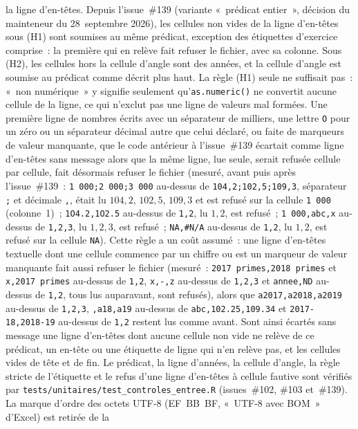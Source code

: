 \documentclass[a4paper,11pt]{article}
\newcommand{\code}[1]{\texttt{\small #1}}
\begin{document}
la ligne d'en-têtes. Depuis l'issue~\#139 (variante «~prédicat entier~», décision du mainteneur
du 28~septembre 2026), les cellules non vides de la ligne d'en-têtes sous (H1) sont soumises au
même prédicat, exception des étiquettes d'exercice comprise~: la première qui en relève fait
refuser le fichier, avec sa colonne. Sous (H2), les cellules hors la cellule d'angle sont des
années, et la cellule d'angle est soumise au prédicat comme décrit plus haut. La règle (H1)
seule ne suffisait pas~: «~non numérique~» y signifie seulement qu'\code{as.numeric()} ne
convertit aucune cellule de la ligne, ce qui n'exclut pas une ligne de valeurs mal formées. Une
première ligne de nombres écrits avec un séparateur de milliers, une lettre \code{O} pour un
zéro ou un séparateur décimal autre que celui déclaré, ou faite de marqueurs de valeur
manquante, que le code antérieur à l'issue~\#139 écartait comme ligne d'en-têtes sans message
alors que la même ligne, lue seule, serait refusée cellule par cellule, fait désormais refuser
le fichier (mesuré, avant puis après l'issue~\#139~: \code{1 000;2 000;3 000} au-dessus de
\code{104,2;102,5;109,3}, séparateur \code{;} et décimale \code{,}, était lu $104{,}2$,
$102{,}5$, $109{,}3$ et est refusé sur la cellule \code{1 000} (colonne~1)~; \code{1O4.2,1O2.5}
au-dessus de \code{1,2}, lu $1, 2$, est refusé~; \code{1 000,abc,x} au-dessus de \code{1,2,3},
lu $1, 2, 3$, est refusé~; \code{NA,\#N/A} au-dessus de \code{1,2}, lu $1, 2$, est refusé sur
la cellule \code{NA}). Cette règle a un coût assumé~: une ligne d'en-têtes textuelle dont une
cellule commence par un chiffre ou est un marqueur de valeur manquante fait aussi refuser le
fichier (mesuré~: \code{2017 primes,2018 primes} et \code{x,2017 primes} au-dessus de
\code{1,2}, \code{x,-,z} au-dessus de \code{1,2,3} et \code{annee,ND} au-dessus de \code{1,2},
tous lus auparavant, sont refusés), alors que \code{a2017,a2018,a2019} au-dessus de
\code{1,2,3}, \code{,a18,a19} au-dessus de \code{abc,102.25,109.34} et
\code{2017-18,2018-19} au-dessus de \code{1,2} restent lus comme avant. Sont ainsi écartés sans
message une ligne d'en-têtes dont aucune cellule non vide ne relève de ce prédicat, un en-tête ou
une étiquette de ligne qui n'en relève pas, et les cellules vides de tête et de fin. Le prédicat,
la ligne d'années, la cellule d'angle, la règle stricte de l'étiquette et le refus d'une ligne
d'en-têtes à cellule fautive sont vérifiés par \code{tests/unitaires/test\_controles\_entree.R}
(issues~\#102, \#103 et~\#139).
La marque d'ordre des octets UTF-8 (EF~BB~BF, «~UTF-8 avec BOM~» d'Excel) est retirée de la
\end{document}

